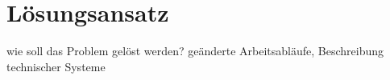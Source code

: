 \chapter{Lösungsansatz}\label{ch:experiments}

wie soll das Problem gelöst werden? geänderte Arbeitsabläufe, Beschreibung technischer Systeme
